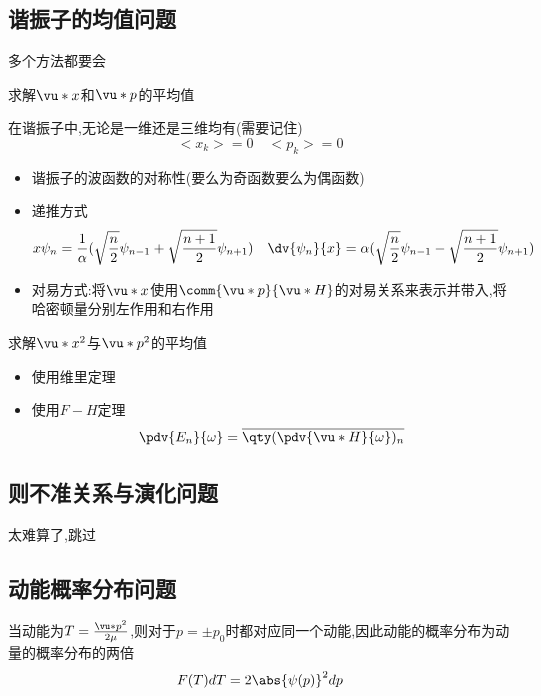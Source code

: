         \subsection{谐振子的均值问题}
            多个方法都要会
            \begin{formal}

                求解$\vu*{x}$和$\vu*{p}$的平均值

                在谐振子中,无论是一维还是三维均有(需要记住)
                $$ <x_{k}> = 0 \quad <p_{k}> = 0 $$
                \begin{itemize}
                    \item   谐振子的波函数的对称性(要么为奇函数要么为偶函数)
                    \item   递推方式 
                    $$  
                    x \psi_{n} = \frac{1}{\alpha}(\sqrt{\frac{n}{2}}\psi_{n-1} + \sqrt{\frac{n+1}{2}} \psi_{n+1})  
                    \quad \dv{\psi_{n}}{x} = \alpha (\sqrt{\frac{n}{2}}\psi_{n-1} - \sqrt{\frac{n+1}{2}} \psi_{n+1}) 
                    $$
                    \item   对易方式:将$\vu*{x}$使用$\comm{\vu*{p}}{\vu*{H}}$的对易关系来表示并带入,将哈密顿量分别左作用和右作用
                \end{itemize}

                求解$\vu*{x}^{2}$与$\vu*{p}^{2}$的平均值
                \begin{itemize}
                    \item 使用维里定理
                    \item 使用$F-H$定理
                    $$ \pdv{E_{n}}{\omega}  = \overline{\qty(\pdv{\vu*{H}}{\omega})_{n}} $$
                \end{itemize}

            \end{formal}


        \subsection{则不准关系与演化问题}
            太难算了,跳过
        \subsection{动能概率分布问题}
            当动能为$T = \frac{\vu*{p}^{2}}{2 \mu}$,则对于$p=\pm p_{0}$时都对应同一个动能,因此动能的概率分布为动量的概率分布的两倍
            $$ F(T)dT = 2 \abs{\psi(p)}^{2} dp $$

